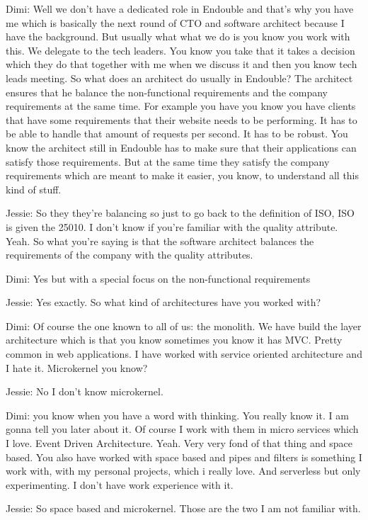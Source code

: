 Dimi: Well we don't have a dedicated role in Endouble and that's why you have me which is basically the next round of CTO and software architect because I have the background. But usually what what we do is you know you work with this. We delegate to the tech leaders. You know you take that it takes a decision which they do that together with me when we discuss it and then you know tech leads meeting. So what does an architect do usually in Endouble? The architect ensures that he balance the non-functional requirements and the company requirements at the same time. For example you have you know you have clients that have some requirements that their website needs to be performing. It has to be able to handle that amount of requests per second. It has to be robust. You know the architect still in Endouble has to make sure that their applications can satisfy those requirements. But at the same time they satisfy the company requirements which are meant to make it easier, you know, to understand all this kind of stuff.

Jessie: So they they're balancing so just to go back to the definition of ISO, ISO is given the 25010. I don't know if you're familiar with the quality attribute. Yeah. So what you're saying is that the software architect balances the requirements of the company with the quality attributes.

Dimi: Yes but with a special focus on the non-functional requirements

Jessie: Yes exactly. So what kind of architectures have you worked with?

Dimi: Of course the one known to all of us: the monolith. We have build the layer architecture which is that you know sometimes you know it has MVC. Pretty common in web applications. I have worked with service oriented architecture and I hate it. Microkernel you know?

Jessie: No I don't know microkernel.

Dimi: you know when you have a word with thinking. You really know it. I am gonna tell you later about it. Of course I work with them in micro services which I love. Event Driven Architecture. Yeah. Very very fond of that thing and space based. You also have worked with space based and pipes and filters is something I work with, with my personal projects, which i really love. And serverless but only experimenting. I don't have work experience with it.

Jessie: So space based and microkernel. Those are the two I am not familiar with.

